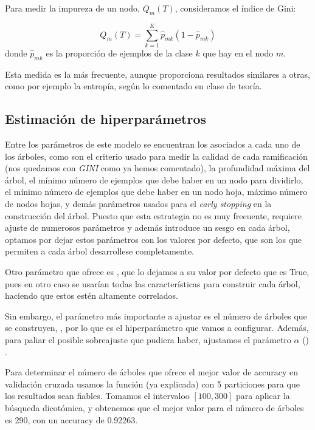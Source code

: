 \documentclass[a4]{article}
\begin{document}
Para medir la impureza de un nodo, $Q_m(T)$,
consideramos el índice de Gini:

\[Q_m(T) = \sum\limits_{k=1}^{K} \hat p_{mk}(1 - \hat p_{mk})\] donde
$\hat p_{mk}$ es la proporción de ejemplos de la clase $k$ que hay en el nodo $m$.

Esta medida es la más frecuente, aunque proporciona resultados similares a otras,  como por ejemplo la entropía, según lo comentado en clase de teoría.

\subsection{Estimación de hiperparámetros}

Entre los parámetros de este modelo se encuentran los asociados a cada uno de los árboles, como son el criterio usado para medir la calidad de cada ramificación (nos quedamos con \textit{GINI} como ya hemos comentado), la profundidad máxima del árbol, el mínimo número de ejemplos que debe haber en un nodo para dividirlo, el mínimo número de ejemplos que debe haber en un nodo hoja, máximo número de nodos hojas, y demás parámetros usados para el \textit{early stopping} en la construcción del árbol. Puesto que esta estrategia no es muy frecuente, requiere ajuste de numerosos parámetros y además introduce un sesgo en cada árbol, optamos por dejar estos parámetros con los valores por defecto, que son los que permiten a cada árbol desarrollese completamente. 

Otro parámetro que ofrece  es , que lo dejamos a su valor por defecto que es True, pues en otro caso se usarían todas las características para construir cada árbol, haciendo que estos estén altamente correlados. 

Sin embargo, el parámetro más importante a ajustar es el número de árboles que se construyen, , por lo que es el hiperparámetro que vamos a configurar. Además, para paliar el posible sobreajuste que pudiera haber, ajustamos el parámetro  $\alpha$ () .

Para determinar el número de árboles que ofrece el mejor valor de accuracy en validación cruzada usamos la función (ya explicada) con 5 particiones para que los resultados sean fiables. Tomamos el intervaloo $[100,300]$ para aplicar la búsqueda dicotómica, y obtenemos que el mejor valor para el número de árboles es 290, con un accuracy de 0.92263.
\end{document}
